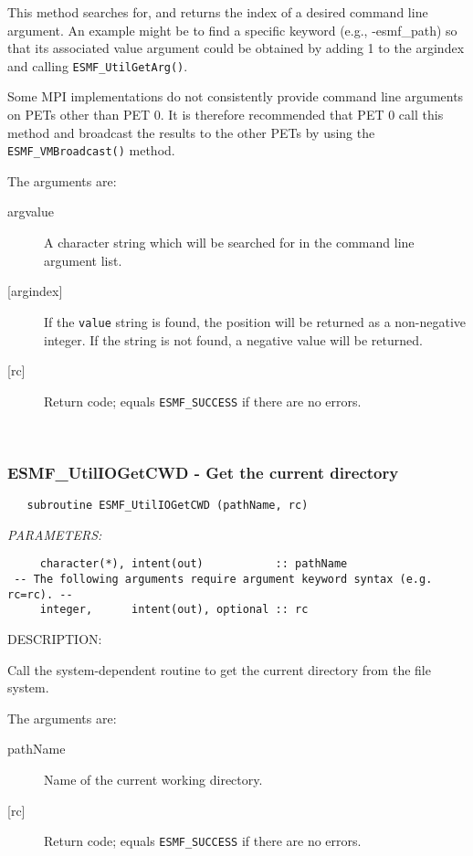    This method searches for, and returns the index of a desired command
   line argument.  An example might be to find a specific keyword
   (e.g., -esmf\_path) so that its associated value argument could be
   obtained by adding 1 to the argindex and calling {\tt ESMF\_UtilGetArg()}.
  
   Some MPI implementations do not consistently provide command line
   arguments on PETs other than PET 0.  It is therefore recommended
   that PET 0 call this method and broadcast the results to the other
   PETs by using the {\tt ESMF\_VMBroadcast()} method.
  
   The arguments are:
  
   \begin{description}
   \item [argvalue]
   A character string which will be searched for in the command line
   argument list.
   \item [{[argindex]}]
   If the {\tt value} string is found, the position will be returned
   as a non-negative integer.  If the string is not found, a negative
   value will be returned.
   \item [{[rc]}]
   Return code; equals {\tt ESMF\_SUCCESS} if there are no errors.
   \end{description} 
 
\mbox{}\hrulefill\ 
 
\subsubsection [ESMF\_UtilIOGetCWD] {ESMF\_UtilIOGetCWD - Get the current directory}


  
\begin{verbatim}   subroutine ESMF_UtilIOGetCWD (pathName, rc)\end{verbatim}{\em PARAMETERS:}
\begin{verbatim}     character(*), intent(out)           :: pathName
 -- The following arguments require argument keyword syntax (e.g. rc=rc). --
     integer,      intent(out), optional :: rc\end{verbatim}
{\sf DESCRIPTION:\\ }


     Call the system-dependent routine to get the current directory from the file
     system.
  
       The arguments are:
       \begin{description}
       \item[pathName]
         Name of the current working directory.
       \item[{[rc]}]
         Return code; equals {\tt ESMF\_SUCCESS} if there are no errors.
       \end{description} 
 
